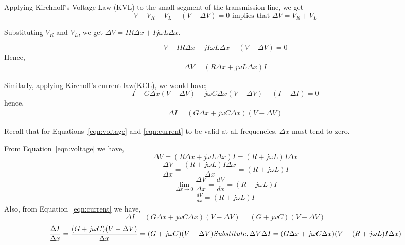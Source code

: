 Applying Kirchhoff's Voltage Law (KVL) to the small segment of the transmission line, we get
\begin{dmath*}
V - V_{R} - V_{L} - (V - \Delta V) = 0 \text{ implies that $\Delta V = V_{R} + V_{L}$}
\end{dmath*}

Substituting \(V_{R}\) and \(V_{L}\), we get \(\Delta V = IR \Delta x + Ij\omega L \Delta x\).

\begin{dmath*}
V  - IR\Delta x - jI\omega L\Delta x - (V - \Delta V) = 0
\end{dmath*}
Hence,
\begin{align}  
\Delta V = (R \Delta x + j\omega L\Delta x)I
\label{eqn:voltage}
\end{align}

Similarly, applying Kirchoff's current law(KCL), we would have;
\begin{dmath*}
I  - G\Delta x (V - \Delta V) - j\omega C\Delta x (V - \Delta V) - (I - \Delta I) = 0
\end{dmath*}
hence,
\begin{align}
\Delta I = (G \Delta x + j \omega C \Delta x) (V - \Delta V)
\label{eqn:current}
\end{align}

Recall that for Equations~\eqref{eqn:voltage} and \eqref{eqn:current} to be valid at all frequencies, $\Delta x$ must tend to zero.

From Equation~\eqref{eqn:voltage} we have,
\begin{dmath*}
\Delta V =  (R \Delta x + j\omega L\Delta x)I = (R + j\omega L)I\Delta x
\end{dmath*}
\begin{dmath*}
\frac{\Delta V }{\Delta x} = \frac{  (R  + j\omega L)I\Delta x}{\Delta x} =  (R  + j\omega L) I
\end{dmath*}
\[ \lim_{\Delta x\to 0} \frac{\Delta V}{ \Delta x} = \frac{dV}{dx} =  (R + j \omega L)I \]
\begin{align}
\frac{dV}{dx} =  (R + j \omega L)I 
\label{eqn:deltav}
\end{align} 
Also, from Equation~\eqref{eqn:current} we have,
\begin{dmath*}
\Delta I =  (G \Delta x + j\omega C\Delta x) (V - \Delta V) =  (G + j\omega C)(V - \Delta V)
\end{dmath*}
\begin{dmath*}
\frac{\Delta I}{\Delta x} = \frac{  (G + j\omega C)(V - \Delta V)}{\Delta x} =   (G + j\omega C) (V - \Delta V)
\newline
\newline
Substitute, \Delta V 
\newline
\newline
\Delta I = (G\Delta x + j\omega C\Delta x)(V -  (R + j\omega L)I\Delta x)
\end{dmath*}

